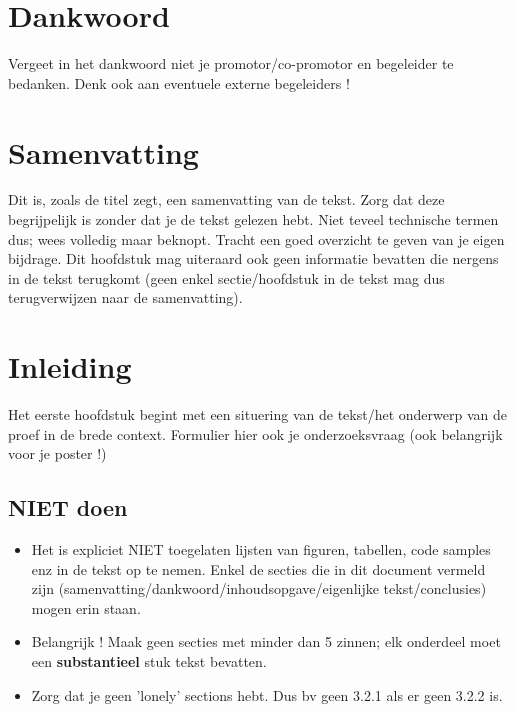 \documentclass{book}
\begin{document}
\chapter*{Dankwoord}
Vergeet in het dankwoord niet je promotor/co-promotor en begeleider te bedanken. Denk ook aan eventuele externe begeleiders !

\chapter*{Samenvatting}
Dit is, zoals de titel zegt, een samenvatting van de tekst. Zorg dat deze begrijpelijk is zonder dat je de tekst gelezen hebt. Niet teveel technische termen dus; wees volledig maar beknopt. Tracht een goed overzicht te geven van je eigen bijdrage. Dit hoofdstuk mag uiteraard ook geen informatie bevatten die nergens in de tekst terugkomt (geen enkel sectie/hoofdstuk in de tekst mag dus terugverwijzen naar de samenvatting).

\lipsum[1]{}

\tableofcontents

\chapter{Inleiding}
\label{Inleiding}

Het eerste hoofdstuk begint met een situering van de tekst/het onderwerp van de proef in de brede context. Formulier hier ook je onderzoeksvraag (ook belangrijk voor je poster !)

\section{NIET doen}

\begin{itemize}
\item Het is expliciet NIET toegelaten lijsten van figuren, tabellen, code samples enz in de tekst op te nemen. Enkel de secties die in dit document vermeld zijn (samenvatting/dankwoord/inhoudsopgave/eigenlijke tekst/conclusies) mogen erin staan.
\item Belangrijk ! Maak geen secties met minder dan 5 zinnen; elk onderdeel moet een \textbf{substantieel} stuk tekst bevatten.
\item Zorg dat je geen 'lonely' sections hebt. Dus bv geen 3.2.1 als er geen 3.2.2 is. 
\end{itemize}
\end{document}
